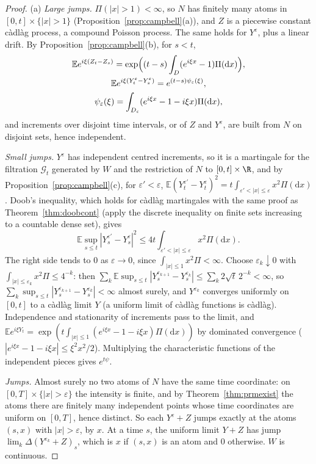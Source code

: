 \begin{proof}
(a) \emph{Large jumps.} $\Pi(|x|>1)<\infty$, so $N$ has finitely many atoms in $[0,t]\times\{|x|>1\}$ (Proposition~\ref{prop:campbell}(a)), and $Z$ is a piecewise constant c\`adl\`ag process, a compound Poisson process. The
same holds for $Y^\varepsilon$, plus a linear drift. By Proposition~\ref{prop:campbell}(b), for $s<t$,
\begin{gather*}
\mathbb Ee^{i\xi(Z_t-Z_s)}=\exp\Bigl((t-s)\int_D(e^{i\xi x}-1)\Pi(\mathrm dx)\Bigr),\\
\mathbb Ee^{i\xi(Y^\varepsilon_t-Y^\varepsilon_s)}=e^{(t-s)\psi_\varepsilon(\xi)},\\\psi_\varepsilon(\xi)=\int_{D_\varepsilon}(e^{i\xi x}-1-i\xi x)\Pi(\mathrm dx),
\end{gather*}
and increments over disjoint time intervals, or of $Z$ and $Y^\varepsilon$, are built from $N$ on disjoint sets, hence independent.

\emph{Small jumps.} $Y^\varepsilon$ has independent centred increments, so it is a martingale for the filtration $\mathcal G_t$ generated by $W$ and the restriction of $N$ to $[0,t]\times\R$, and by Proposition~\ref{prop:campbell}(c),
for $\varepsilon'<\varepsilon$, $\mathbb E(Y^{\varepsilon'}_t-Y^\varepsilon_t)^2=t\int_{\varepsilon'<|x|\le\varepsilon}x^2\Pi(\mathrm dx)$. Doob's inequality, which holds for c\`adl\`ag martingales with the same proof as Theorem~\ref{thm:doobcont}
(apply the discrete inequality on finite sets increasing to a countable dense set), gives
\[
\mathbb E\sup_{s\le t}|Y^{\varepsilon'}_s-Y^\varepsilon_s|^2\le4t\int_{\varepsilon'<|x|\le\varepsilon}x^2\Pi(\mathrm dx).
\]
The right side tends to $0$ as $\varepsilon\to0$, since $\int_{|x|\le1}x^2\Pi<\infty$. Choose $\varepsilon_k\downarrow0$ with $\int_{|x|\le\varepsilon_k}x^2\Pi\le4^{-k}$: then $\sum_k\mathbb E\sup_{s\le t}|Y^{\varepsilon_{k+1}}_s-Y^{\varepsilon_k}_s|\le\sum_k2\sqrt t\,2^{-k}<\infty$,
so $\sum_k\sup_{s\le t}|Y^{\varepsilon_{k+1}}_s-Y^{\varepsilon_k}_s|<\infty$ almost surely, and $Y^{\varepsilon_k}$ converges uniformly on $[0,t]$ to a c\`adl\`ag limit $Y$ (a uniform limit of c\`adl\`ag functions is c\`adl\`ag). Independence and stationarity of increments pass to the limit, and
$\mathbb Ee^{i\xi Y_t}=\exp(t\int_{|x|\le1}(e^{i\xi x}-1-i\xi x)\Pi(\mathrm dx))$ by dominated convergence ($|e^{i\xi x}-1-i\xi x|\le\xi^2x^2/2$). Multiplying the characteristic functions of the independent pieces gives $e^{t\psi}$.

\emph{Jumps.} Almost surely no two atoms of $N$ have the same time coordinate: on $[0,T]\times\{|x|>\varepsilon\}$ the intensity is finite, and by Theorem~\ref{thm:prmexist} the atoms there are finitely many independent points
whose time coordinates are uniform on $[0,T]$, hence distinct. So each $Y^\varepsilon+Z$ jumps exactly at the atoms $(s,x)$ with $|x|>\varepsilon$, by $x$. At a time $s$, the uniform limit $Y+Z$ has jump $\lim_k\Delta(Y^{\varepsilon_k}+Z)_s$, which is $x$ if $(s,x)$ is an atom and
$0$ otherwise. $W$ is continuous.


\end{proof}
